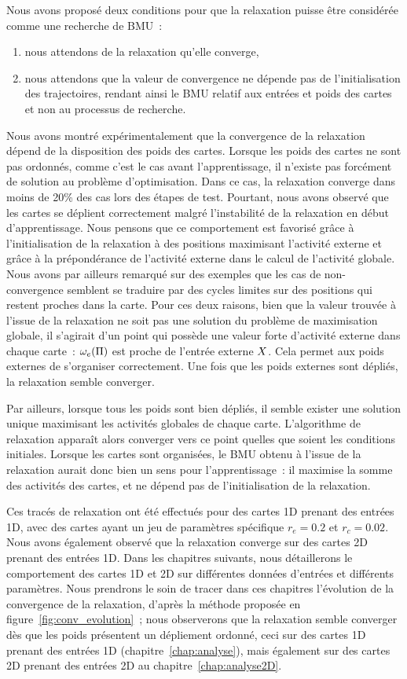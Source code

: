 \documentclass[../main]{subfiles}
\begin{document}
Nous avons proposé deux conditions pour que la relaxation puisse être considérée comme une recherche de BMU~: 
\begin{enumerate}
	\item nous attendons de la relaxation qu'elle converge,
	\item nous attendons que la valeur de convergence ne dépende pas de l'initialisation des trajectoires, rendant ainsi le BMU relatif aux entrées et poids des cartes et non au processus de recherche.
\end{enumerate}

Nous avons montré expérimentalement que la convergence de la relaxation dépend de la disposition des poids des cartes. Lorsque les poids des cartes ne sont pas ordonnés, comme c'est le cas avant l'apprentissage, il n'existe pas forcément de solution au problème d'optimisation. 
Dans ce cas, la relaxation converge dans moins de 20\% des cas lors des étapes de test.
Pourtant, nous avons observé que les cartes se déplient correctement malgré l'instabilité de la relaxation en début d'apprentissage. Nous pensons que ce comportement est favorisé grâce à l'initialisation de la relaxation à des positions maximisant l'activité externe et grâce à la prépondérance de l'activité externe dans le calcul de l'activité globale. Nous avons par ailleurs remarqué sur des exemples que les cas de non-convergence semblent se traduire par des cycles limites sur des positions qui restent proches dans la carte.
Pour ces deux raisons, bien que la valeur trouvée à l'issue de la relaxation ne soit pas une solution du problème de maximisation globale, il s'agirait d'un point qui possède une valeur forte d'activité externe dans chaque carte~: $\omega_e(\Pi)$ est proche de l'entrée externe $X$. Cela permet aux poids externes de s'organiser correctement. Une fois que les poids externes sont dépliés, la relaxation semble converger.


Par ailleurs, lorsque tous les poids sont bien dépliés, il semble exister une solution unique maximisant les activités globales de chaque carte. 
L'algorithme de relaxation apparaît alors converger vers ce point quelles que soient les conditions initiales.
Lorsque les cartes sont organisées, le BMU obtenu à l'issue de la relaxation aurait donc bien un sens pour l'apprentissage~: il maximise la somme des activités des cartes, et ne dépend pas de l'initialisation de la relaxation.


Ces tracés de relaxation ont été effectués pour des cartes 1D prenant des entrées 1D, avec des cartes ayant un jeu de paramètres spécifique $r_e = 0.2$ et $r_c = 0.02$. Nous avons également observé que la relaxation converge sur des cartes 2D prenant des entrées 1D.
Dans les chapitres suivants, nous détaillerons le comportement des cartes 1D et 2D sur différentes données d'entrées et différents paramètres. Nous prendrons le soin de tracer dans ces chapitres l'évolution de la convergence de la relaxation, d'après la méthode proposée en figure~\ref{fig:conv_evolution}~; nous observerons que la relaxation semble converger dès que les poids présentent un dépliement ordonné, ceci sur des cartes 1D prenant des entrées 1D (chapitre~\ref{chap:analyse}), mais également sur des cartes 2D prenant des entrées 2D au chapitre~\ref{chap:analyse2D}.

\ifSubfilesClassLoaded{
    \printbibliography
}{}
\end{document}

